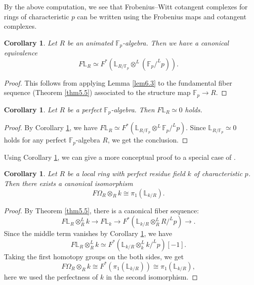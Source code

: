 \documentclass[11pt, a4paper]{amsart}
\theoremstyle{plain}
\newtheorem{coro}[theorem]{Corollary}
\theoremstyle{definition}
\begin{document}
By the above computation, we see that Frobenius--Witt cotangent complexes for rings of characteristic $p$ can be written using the Frobenius maps and cotangent complexes.
\begin{coro}\label{cor6.4}
    Let $R$ be an animated $\mathbb F_p$-algebra. Then we have a canonical equivalence \[F\mathbb L_{R}\simeq F^*(\mathbb L_{R/\mathbb F_p}\otimes^L(\mathbb F_p/^Lp)).\]
\end{coro}
\begin{proof}
    This follows from applying Lemma \ref{lem6.3} to the fundamental fiber sequence (Theorem \ref{thm5.5}) associated to the structure map $\mathbb F_p\to R$. 
\end{proof}
\begin{coro}\label{cor6.5}
    Let $R$ be a perfect $\mathbb F_p$-algebra. Then $F\mathbb L_{R}\simeq 0$ holds.
\end{coro}
\begin{proof}
    By Corollary \ref{cor6.4}, we have $F\mathbb L_R\simeq F^*(\mathbb L_{R/\mathbb F_p}\otimes^L\mathbb F_p/^Lp)$. Since $\mathbb L_{R/\mathbb F_p}\simeq 0$ holds for any perfect $\mathbb F_p$-algebra $R$, we get the conclusion.
\end{proof}
Using Corollary \ref{cor6.5}, we can give a more conceptual proof to a special case of \cite[Corollary 4.12]{Sai22}.

\begin{coro}\label{cor6.5.1}
    Let $R$ be a local ring with perfect residue field $k$ of characteristic $p$. Then there exists a canonical isomorphism\[F\Omega_R\otimes_Rk\cong \pi_1(\mathbb L_{k/R}).\]
\end{coro}
\begin{proof}
    By Theorem \ref{thm5.5}, there is a canonical fiber sequence:\[F\mathbb L_R\otimes_R^Lk\to F\mathbb L_k\to F^*(\mathbb L_{k/R}\otimes_R^LR/^Lp)\to.\]
    Since the middle term vanishes by Corollary \ref{cor6.5}, we have \[F\mathbb L_R\otimes_R^Lk\simeq F^*(\mathbb L_{k/R}\otimes_k^Lk/^Lp)[-1].\] Taking the first homotopy groups on the both sides, we get \[F\Omega_R\otimes_Rk\cong F^*(\pi_1(\mathbb L_{k/R}))\cong \pi_1(\mathbb L_{k/R}),\] here we used the perfectness of $k$ in the second isomorphism.
\end{proof}
\end{document}
